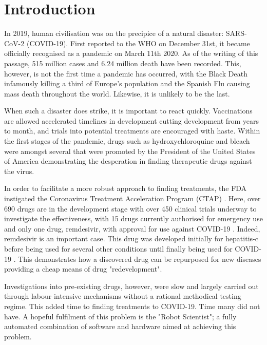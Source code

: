
\chapter{Introduction}  %

\ifpdf
    \graphicspath{{Chapter1/Figs/Raster/}{Chapter1/Figs/PDF/}{Chapter1/Figs/}}
\else
    \graphicspath{{Chapter1/Figs/Vector/}{Chapter1/Figs/}}
\fi

In 2019, human civilisation was on the precipice of a natural disaster: \mbox{SARS-CoV-2} (\mbox{COVID-19}). First reported to the WHO on December 31st, it became officially recognised as a pandemic on March 11th 2020. As of the writing of this passage, 515 million cases and 6.24 million death have been recorded. This, however, is not the first time a pandemic has occurred, with the Black Death infamously killing a third of Europe's population and the Spanish Flu causing mass death throughout the world. Likewise, it is unlikely to be the last.

When such a disaster does strike, it is important to react quickly. Vaccinations are allowed accelerated timelines in development cutting development from years to month, and trials into potential treatments are encouraged with haste. Within the first stages of the pandemic, drugs such as hydroxychloroquine and bleach were amongst several that were promoted by the President of the United States of America demonstrating the desperation in finding therapeutic drugs against the virus.

In order to facilitate a more robust approach to finding treatments, the FDA instigated the Coronavirus Treatment Acceleration Program (CTAP) \cite{CTAP22}. Here, over 690 drugs are in the development stage with over 450 clinical trials underway to investigate the effectiveness, with 15 drugs currently authorised for emergency use and only one drug, remdesivir, with approval for use against \mbox{COVID-19} \cite{CTAP22}. Indeed, remdesivir is an important case. This drug was developed initially for hepatitis-c before being used for several other conditions until finally being used for \mbox{COVID-19} \cite{Joe20}. This demonstrates how a discovered drug can be repurposed for new diseases providing a cheap means of drug "redevelopment".

Investigations into pre-existing drugs, however, were slow and largely carried out through labour intensive mechanisms without a rational methodical testing regime. This added time to finding treatments to \mbox{COVID-19}. Time many did not have. A hopeful fulfilment of this problem is the "Robot Scientist"; a fully automated combination of software and hardware aimed at achieving this problem.